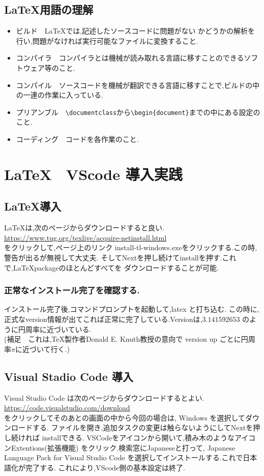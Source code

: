 \documentclass{ltjsarticle}
\begin{document}
\subsection{\LaTeX 用語の理解}
\begin{itemize}
  \item ビルド　\LaTeX では,記述したソースコードに問題がない
        かどうかの解析を行い,問題がなければ実行可能なファイルに変換すること.
  \item コンパイラ　コンパイラとは機械が読み取れる言語に移すことのできるソフトウェア等のこと.
  \item コンパイル　ソースコードを機械が翻訳できる言語に移すことで,ビルドの中の一連の作業に入っている.
  \item プリアンブル　\verb|\documentclass|から\verb|\begin{document}|までの中にある設定のこと.
  \item コーディング　コードを各作業のこと.
\end{itemize}
\section{\LaTeX　VScode 導入実践}

\subsection{\LaTeX 導入}
\LaTeX は,次のページからダウンロードすると良い.\\
\url{https://www.tug.org/texlive/acquire-netinstall.html}\\
をクリックして,ページ上のリンク install-tl-windows.exeをクリックする.この時,
警告が出るが無視して大丈夫.
そしてNextを押し続けてinstallを押す.これで,\LaTeX packageのほとんどすべてを
ダウンロードすることが可能.
\subsubsection*{正常なインストール完了を確認する.}
インストール完了後,コマンドプロンプトを起動して,latex と打ち込む.
この時に,正式なversion情報が出てこれば正常に完了している.Versionは,$3.141592653$
のように円周率に近づいている.\\
(補足　これは,\TeX 製作者Donald E. Knuth教授の意向で
version up ごとに円周率$\pi$に近づいて行く.)
\subsection{Visual Stadio Code 導入}
Visual Studio Code は次のページからダウンロードするとよい.\\
\url{https://code.visualstudio.com/download}\\
をクリックしてそのあとの画面の中から今回の場合は,
Windows を選択してダウンロードする.
ファイルを開き,追加タスクの変更は触らないようにしてNextを押し続ければ
installできる.
VSCodeをアイコンから開いて,積み木のようなアイコンExtentions(拡張機能)
をクリック.検索窓にJapaneseと打って,
Japanese Language Pack for Visual Studio Code
を選択してインストールする.これで日本語化が完了する.
これにより,VScode側の基本設定は終了.
\end{document}
